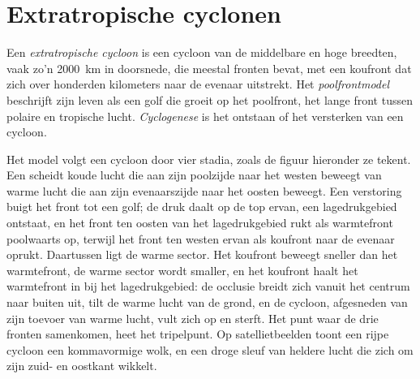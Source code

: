 \section{Extratropische cyclonen}\label{sec:b2:weather-systems:cyclones}

\begin{definition}\label{def:b2:weather-systems:cyclones}
Een \emph{extratropische cycloon} is een cycloon van de middelbare en hoge
breedten, vaak zo'n \qty{2000}{km} in doorsnede, die meestal fronten bevat, met een koufront dat zich
over honderden kilometers naar de evenaar uitstrekt. Het \emph{poolfrontmodel}
beschrijft zijn leven als een golf die groeit op het poolfront, het lange front tussen polaire
en tropische lucht. \emph{Cyclogenese} is het ontstaan of het versterken
van een cycloon.
\end{definition}

Het model volgt een cycloon door vier stadia, zoals de figuur hieronder ze tekent. Een  scheidt koude lucht die aan zijn poolzijde naar het westen beweegt van warme lucht die aan zijn
evenaarszijde naar het oosten beweegt. Een verstoring buigt het front tot een golf; de druk daalt op de top ervan, een
lagedrukgebied ontstaat, en het front ten oosten van het lagedrukgebied rukt als warmtefront poolwaarts op, terwijl het front ten westen
ervan als koufront naar de evenaar oprukt. Daartussen ligt de warme sector. Het koufront
beweegt sneller dan het warmtefront, de warme sector wordt smaller, en het koufront haalt het
warmtefront in bij het lagedrukgebied: de occlusie breidt zich vanuit het centrum naar buiten uit, tilt de warme lucht van de
grond, en de cycloon, afgesneden van zijn toevoer van warme lucht, vult zich op en sterft. Het punt waar de
drie fronten samenkomen, heet het tripelpunt. Op satellietbeelden toont een rijpe cycloon een
kommavormige wolk, en een droge sleuf van heldere lucht die zich om zijn zuid- en oostkant wikkelt.

